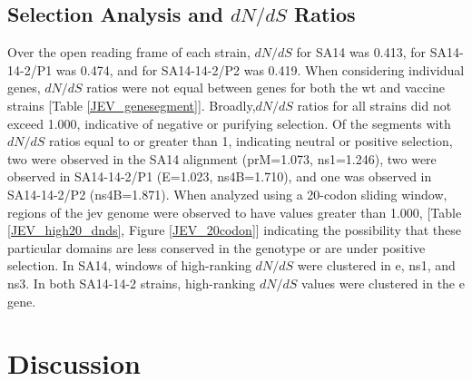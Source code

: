 \subsection{Selection Analysis and $dN/dS$ Ratios}
Over the open reading frame of each strain, $dN/dS$ for SA14 was 0.413, for SA14-14-2/P1 was 0.474, and for SA14-14-2/P2 was 0.419. When considering individual genes, $dN/dS$ ratios were not equal between genes for both the \gls{wt} and vaccine strains [Table \ref{JEV_genesegment}]. Broadly,$dN/dS$ ratios for all strains did not exceed 1.000, indicative of negative or purifying selection. Of the segments with $dN/dS$ ratios equal to or greater than 1, indicating neutral or positive selection, two were observed in the SA14 alignment (prM=1.073, \gls{ns}1=1.246), two were observed in SA14-14-2/P1 (E=1.023, \gls{ns}4B=1.710), and one was observed in SA14-14-2/P2 (\gls{ns}4B=1.871). 
When analyzed using a 20-codon sliding window, regions of the \gls{jev} genome were observed to have values greater than 1.000, [Table \ref{JEV_high20_dnds}, Figure \ref{JEV_20codon}] indicating the possibility that these particular domains are less conserved in the genotype or are under positive selection. In SA14, windows of high-ranking $dN/dS$ were clustered in \gls{e}, \gls{ns}1, and \gls{ns}3. In both SA14-14-2 strains, high-ranking $dN/dS$ values were clustered in the \gls{e} gene.
\section{Discussion}
